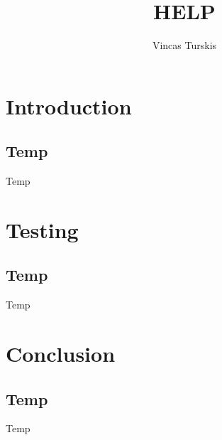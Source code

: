 \documentclass[11pt,a4paper]{report}
\author{Vincas Turskis}
\title{HELP}
\begin{document}
\tableofcontents
\chapter{Introduction}
\section{Temp}
Temp







\chapter{Testing}
\section{Temp}
Temp

\chapter{Conclusion}
\section{Temp}
Temp

\printbibliography
\end{document}
